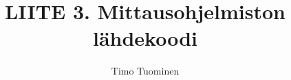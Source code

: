 \documentclass[a4paper,12pt]{article}
\title{LIITE 3. Mittausohjelmiston lähdekoodi}
\date{}
\author{Timo Tuominen}
\begin{document}
\maketitle{}


\renewcommand{\theFancyVerbLine}{
  \sffamily\textcolor[rgb]{0.5,0.5,0.5}{\scriptsize\arabic{FancyVerbLine}}}

\renewcommand*\contentsname{Tiedostot}
\tableofcontents
\end{document}
